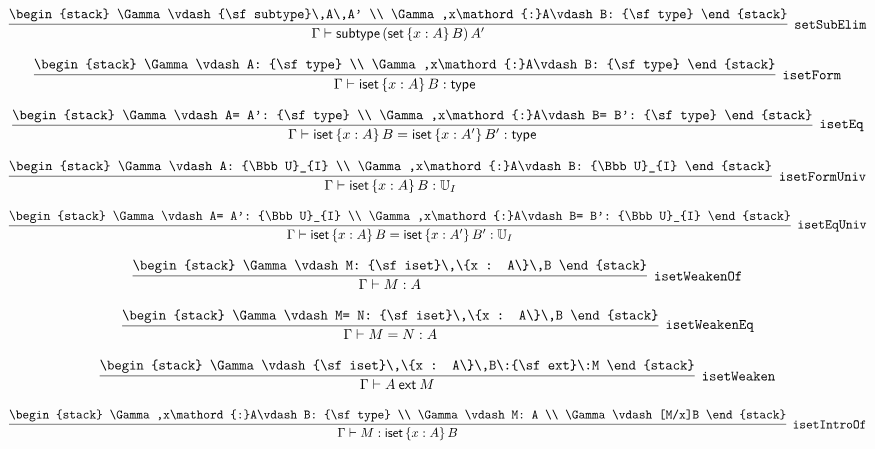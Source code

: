 \[
\infer[{\tt setSubElim}]{\Gamma \vdash {\sf subtype}\,({\sf set}\,\{x : A\}\,B)\,A'}{
\begin{stack}
\Gamma \vdash {\sf subtype}\,A\,A'
\\
\Gamma ,x\mathord{:}A\vdash B: {\sf type}
\end{stack}}
\]

\[
\infer[{\tt isetForm}]{\Gamma \vdash {\sf iset}\,\{x : A\}\,B: {\sf type}}{
\begin{stack}
\Gamma \vdash A: {\sf type}
\\
\Gamma ,x\mathord{:}A\vdash B: {\sf type}
\end{stack}}
\]

\[
\infer[{\tt isetEq}]{\Gamma \vdash {\sf iset}\,\{x : A\}\,B= {\sf iset}\,\{x : A'\}\,B': {\sf type}}{
\begin{stack}
\Gamma \vdash A= A': {\sf type}
\\
\Gamma ,x\mathord{:}A\vdash B= B': {\sf type}
\end{stack}}
\]

\[
\infer[{\tt isetFormUniv}]{\Gamma \vdash {\sf iset}\,\{x : A\}\,B: {\Bbb U}_{I}}{
\begin{stack}
\Gamma \vdash A: {\Bbb U}_{I}
\\
\Gamma ,x\mathord{:}A\vdash B: {\Bbb U}_{I}
\end{stack}}
\]

\[
\infer[{\tt isetEqUniv}]{\Gamma \vdash {\sf iset}\,\{x : A\}\,B= {\sf iset}\,\{x : A'\}\,B': {\Bbb U}_{I}}{
\begin{stack}
\Gamma \vdash A= A': {\Bbb U}_{I}
\\
\Gamma ,x\mathord{:}A\vdash B= B': {\Bbb U}_{I}
\end{stack}}
\]

\[
\infer[{\tt isetWeakenOf}]{\Gamma \vdash M: A}{
\begin{stack}
\Gamma \vdash M: {\sf iset}\,\{x : A\}\,B
\end{stack}}
\]

\[
\infer[{\tt isetWeakenEq}]{\Gamma \vdash M= N: A}{
\begin{stack}
\Gamma \vdash M= N: {\sf iset}\,\{x : A\}\,B
\end{stack}}
\]

\[
\infer[{\tt isetWeaken}]{\Gamma \vdash A\:{\sf ext}\:M}{
\begin{stack}
\Gamma \vdash {\sf iset}\,\{x : A\}\,B\:{\sf ext}\:M
\end{stack}}
\]

\[
\infer[{\tt isetIntroOf}]{\Gamma \vdash M: {\sf iset}\,\{x : A\}\,B}{
\begin{stack}
\Gamma ,x\mathord{:}A\vdash B: {\sf type}
\\
\Gamma \vdash M: A
\\
\Gamma \vdash [M/x]B
\end{stack}}
\]

